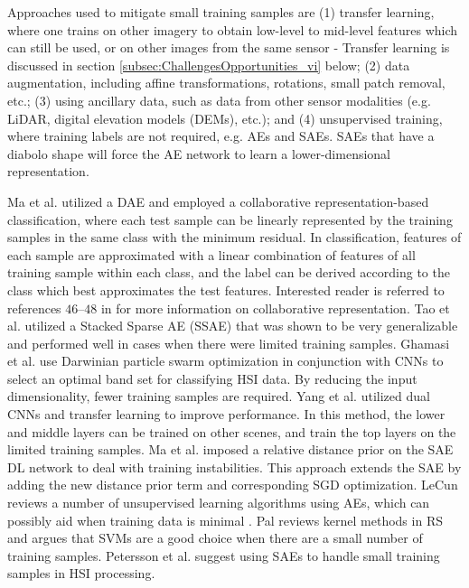 \documentclass[12pt]{spieman}
\begin{document}
\begin{spacing}{1}
Approaches used to mitigate small training samples are (1) transfer learning, where one trains on other imagery to obtain low-level to mid-level features which can still be used, or on other images from the same sensor - Transfer learning is discussed in section \ref{subsec:ChallengesOpportunities_vi} below; (2) data augmentation, including affine transformations, rotations, small patch removal, etc.; (3) using ancillary data, such as data from other sensor modalities (e.g. LiDAR, digital elevation models (DEMs), etc.); and (4) unsupervised training, where training labels are not required, e.g. AEs and SAEs. SAEs that have a diabolo shape will force the AE network to learn a lower-dimensional representation.

Ma et al. \cite{ma2016spectral} utilized a DAE and employed a collaborative representation-based classification, where each test sample can be linearly represented by the training samples in the same class with the minimum residual. In classification, features of each sample are approximated with a linear combination of features of all training sample within each class, and the label can be derived according to the class which best approximates the test features. Interested reader is referred to references $46$--$48$ in \cite{ma2016spectral} for more information on collaborative representation. Tao et al. \cite{Tao2015Unsupervised} utilized a Stacked Sparse AE (SSAE) that was shown to be very generalizable and performed well in cases when there were limited training samples. Ghamasi et al. \cite{Ghamisi2016SelfImproving} use Darwinian particle swarm optimization in conjunction with CNNs to select an optimal band set for classifying HSI data. By reducing the input dimensionality, fewer training samples are required. Yang et al. \cite{Yang2016Two} utilized dual CNNs and transfer learning to improve performance. In this method, the lower and middle layers can be trained on other scenes, and train the top layers on the limited training samples. Ma et al. \cite{ma2016hyperspectral} imposed a relative distance prior on the SAE DL network to deal with training instabilities. This approach extends the SAE by adding the new distance prior term and corresponding SGD optimization. LeCun reviews a number of unsupervised learning algorithms using AEs, which can possibly aid when training data is minimal \cite{lecun2012learning} . Pal \cite{pal2009kernel} reviews kernel methods in RS and argues that SVMs are a good choice when there are a small number of training samples. Petersson et al. \cite{petersson2016hyperspectral} suggest using SAEs to handle small training samples in HSI processing.



\end{spacing}
\end{document}
